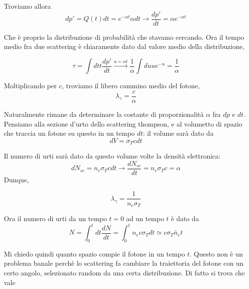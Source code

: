 \documentclass{report}
\begin{document}
Troviamo allora 
\begin{equation}
    dp' = Q(t)dt = e^{-\alpha t}\alpha dt \rightarrow \frac{dp'}{dt} = \alpha e^{-\alpha t}
\end{equation}

Che è proprio la distribuzione di probabilità che stavamo cercando. Ora il tempo medio fra due scattering è chiaramente dato dal valore medio della distribuzione, 

\begin{equation}
    \tau = \int dt t \frac{dp'}{dt} \xrightarrow{u = \alpha t} \frac{1}{\alpha}\int du u e^{-u} = \frac{1}{\alpha}
\end{equation}

Moltiplicando per $c$, troviamo il libero cammino medio del fotone, 
\begin{equation}
    \lambda_\gamma = \frac{c}{\alpha}
\end{equation}

Naturalmente rimane da determinare la costante di proporzionalità $\alpha$ fra $dp$ e $dt$. Pensiamo alla sezione d'urto dello scattering thompson, e al volumetto di spazio che traccia un fotone su questo in un tempo $dt$: il volume sarà dato da 
\begin{equation}
    dV = \sigma_T cdt
\end{equation}

Il numero di urti sarà dato da questo volume volte la densità elettronica: 
\begin{equation}
    dN_{sc} = n_e \sigma_T c dt \rightarrow \frac{dN_{sc}}{dt} = n_e\sigma_T c = \alpha
\end{equation}
Dunque, 
\begin{tcolorbox}[colback=gray!15, colframe=black, boxrule=1pt]
\begin{equation}
    \lambda_\gamma = \frac{1}{n_e\sigma_T}
\end{equation}
\end{tcolorbox}

Ora il numero di urti da un tempo $t=0$ ad un tempo $t$ è dato da 
\begin{equation}
    N = \int_0^t dt \frac{dN}{dt} = \int_0^t n_e c\sigma_T dt  \simeq c\sigma_T \bar{n}_e t
\end{equation}

Mi chiedo quindi quanto spazio compie il fotone in un tempo $t$. Questo non è un problema banale perchè lo scattering fa cambiare la traiettoria del fotone con un certo angolo, selezionato random da una certa distribuzione. Di fatto si trova che vale 
\end{document}
